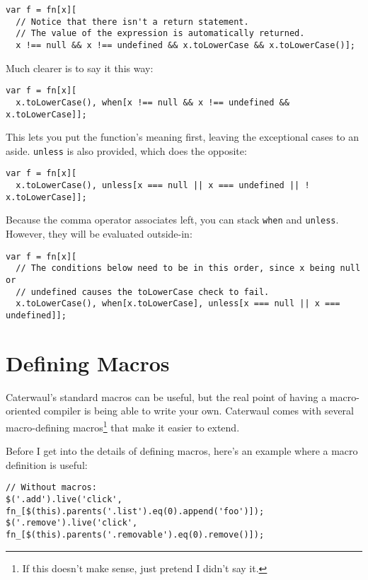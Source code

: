 \documentclass{report}
\begin{document}
\begin{verbatim}
var f = fn[x][
  // Notice that there isn't a return statement.
  // The value of the expression is automatically returned.
  x !== null && x !== undefined && x.toLowerCase && x.toLowerCase()];
\end{verbatim}

    Much clearer is to say it this way:

\begin{verbatim}
var f = fn[x][
  x.toLowerCase(), when[x !== null && x !== undefined && x.toLowerCase]];
\end{verbatim}

    This lets you put the function's meaning first, leaving the exceptional cases to an aside. {\tt unless} is also provided, which does the opposite:

\begin{verbatim}
var f = fn[x][
  x.toLowerCase(), unless[x === null || x === undefined || ! x.toLowerCase]];
\end{verbatim}

    Because the comma operator associates left, you can stack {\tt when} and {\tt unless}. However, they will be evaluated outside-in:

\begin{verbatim}
var f = fn[x][
  // The conditions below need to be in this order, since x being null or
  // undefined causes the toLowerCase check to fail.
  x.toLowerCase(), when[x.toLowerCase], unless[x === null || x === undefined]];
\end{verbatim}
\chapter{Defining Macros}\label{sec:defining-macros}
  Caterwaul's standard macros can be useful, but the real point of having a macro-oriented compiler is being able to write your own. Caterwaul comes with several macro-defining
  macros\footnote{If this doesn't make sense, just pretend I didn't say it.} that make it easier to extend.

  Before I get into the details of defining macros, here's an example where a macro definition is useful:

\begin{verbatim}
// Without macros:
$('.add').live('click', fn_[$(this).parents('.list').eq(0).append('foo')]);
$('.remove').live('click', fn_[$(this).parents('.removable').eq(0).remove()]);
\end{verbatim}
\end{document}
